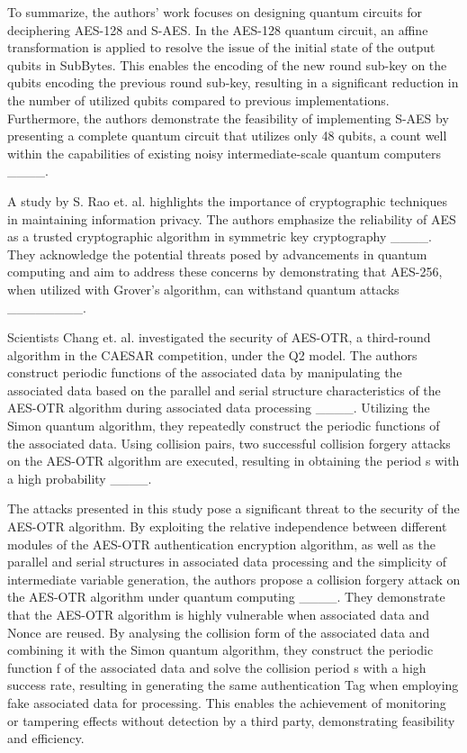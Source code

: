 To summarize, the authors' work focuses on designing quantum circuits for deciphering AES-128 and S-AES. In the AES-128 quantum circuit, an affine transformation is applied to resolve the issue of the initial state of the output qubits in SubBytes. This enables the encoding of the new round sub-key on the qubits encoding the previous round sub-key, resulting in a significant reduction in the number of utilized qubits compared to previous implementations. Furthermore, the authors demonstrate the feasibility of implementing S-AES by presenting a complete quantum circuit that utilizes only 48 qubits, a count well within the capabilities of existing noisy intermediate-scale quantum computers ____. 


A study by S. Rao et. al. highlights the importance of cryptographic techniques in maintaining information privacy. The authors emphasize the reliability of AES as a trusted cryptographic algorithm in symmetric key cryptography ____. They acknowledge the potential threats posed by advancements in quantum computing and aim to address these concerns by demonstrating that AES-256, when utilized with Grover's algorithm, can withstand quantum attacks ________. 
 

Scientists Chang et. al. investigated the security of AES-OTR, a third-round algorithm in the CAESAR competition, under the Q2 model. The authors construct periodic functions of the associated data by manipulating the associated data based on the parallel and serial structure characteristics of the AES-OTR algorithm during associated data processing ____. Utilizing the Simon quantum algorithm, they repeatedly construct the periodic functions of the associated data. Using collision pairs, two successful collision forgery attacks on the AES-OTR algorithm are executed, resulting in obtaining the period s with a high probability ____. 
 

The attacks presented in this study pose a significant threat to the security of the AES-OTR algorithm. By exploiting the relative independence between different modules of the AES-OTR authentication encryption algorithm, as well as the parallel and serial structures in associated data processing and the simplicity of intermediate variable generation, the authors propose a collision forgery attack on the AES-OTR algorithm under quantum computing ____. They demonstrate that the AES-OTR algorithm is highly vulnerable when associated data and Nonce are reused. By analysing the collision form of the associated data and combining it with the Simon quantum algorithm, they construct the periodic function f of the associated data and solve the collision period s with a high success rate, resulting in generating the same authentication Tag when employing fake associated data for processing. This enables the achievement of monitoring or tampering effects without detection by a third party, demonstrating feasibility and efficiency. 


